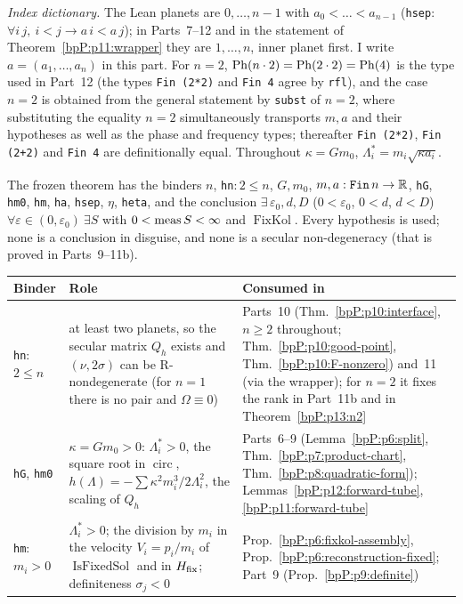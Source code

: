 \emph{Index dictionary.} The Lean planets are $0,\dots,n-1$ with $a_0<\dots<a_{n-1}$ (\texttt{hsep}: \texttt{$\forall i\,j,\ i<j\to a\,i<a\,j$}); in Parts~7--12 and in the statement of Theorem~\ref{bpP:p11:wrapper} they are $1,\dots,n$, inner planet first. I write $a=(a_1,\dots,a_n)$ in this part. For $n=2$, $\mathrm{Ph}(n\cdot2)=\mathrm{Ph}(2\cdot2)=\mathrm{Ph}(4)$ is the type used in Part~12 (the types \texttt{Fin (2*2)} and \texttt{Fin 4} agree by \texttt{rfl}), and the case $n=2$ is obtained from the general statement by \texttt{subst} of $n=2$, where substituting the equality $n=2$ simultaneously transports $m,a$ and their hypotheses as well as the phase and frequency types; thereafter \texttt{Fin (2*2)}, \texttt{Fin (2+2)} and \texttt{Fin 4} are definitionally equal. Throughout $\kappa=Gm_0$, $\Lambda_i^*=m_i\sqrt{\kappa a_i}$.

\begin{remark}\label{bpP:p13:binders}
The frozen theorem has the binders $n$, \texttt{hn}$:2\le n$, $G,m_0$, $m,a:\texttt{Fin}\,n\to\mathbb{R}$, \texttt{hG}, \texttt{hm0}, \texttt{hm}, \texttt{ha}, \texttt{hsep}, $\eta$, \texttt{heta}, and the conclusion $\exists\,\varepsilon_0,d,D$ ($0<\varepsilon_0$, $0<d$, $d<D$) $\forall\varepsilon\in(0,\varepsilon_0)\ \exists S$ with $0<\operatorname{meas} S<\infty$ and $\operatorname{FixKol}$. Every hypothesis is used; none is a conclusion in disguise, and none is a secular non-degeneracy (that is proved in Parts~9--11b).
\begin{center}\small
\begin{tabular}{@{}p{2.1cm}p{5.2cm}p{4.6cm}@{}}
\hline
Binder & Role & Consumed in\\
\hline
\texttt{hn}: $2\le n$ & at least two planets, so the secular matrix $Q_h$ exists and $(\nu,2\sigma)$ can be R-nondegenerate (for $n=1$ there is no pair and $\Omega\equiv0$) & Parts~10 (Thm.~\ref{bpP:p10:interface}, $n\ge2$ throughout; Thm.~\ref{bpP:p10:good-point}, Thm.~\ref{bpP:p10:F-nonzero}) and~11 (via the wrapper); for $n=2$ it fixes the rank in Part~11b and in Theorem~\ref{bpP:p13:n2}\\
\texttt{hG}, \texttt{hm0} & $\kappa=Gm_0>0$: $\Lambda^*_i>0$, the square root in $\operatorname{circ}$, $h(\Lambda)=-\sum\kappa^2m_i^3/2\Lambda_i^2$, the scaling of $Q_h$ & Parts~6--9 (Lemma~\ref{bpP:p6:split}, Thm.~\ref{bpP:p7:product-chart}, Thm.~\ref{bpP:p8:quadratic-form}); Lemmas~\ref{bpP:p12:forward-tube}, \ref{bpP:p11:forward-tube}\\
\texttt{hm}: $m_i>0$ & $\Lambda^*_i>0$; the division by $m_i$ in the velocity $V_i=p_i/m_i$ of $\operatorname{IsFixedSol}$ and in $H_{\rm fix}$; definiteness $\sigma_j<0$ & Prop.~\ref{bpP:p6:fixkol-assembly}, Prop.~\ref{bpP:p6:reconstruction-fixed}; Part~9 (Prop.~\ref{bpP:p9:definite})\\

\end{tabular}
\end{center}
\end{remark}
